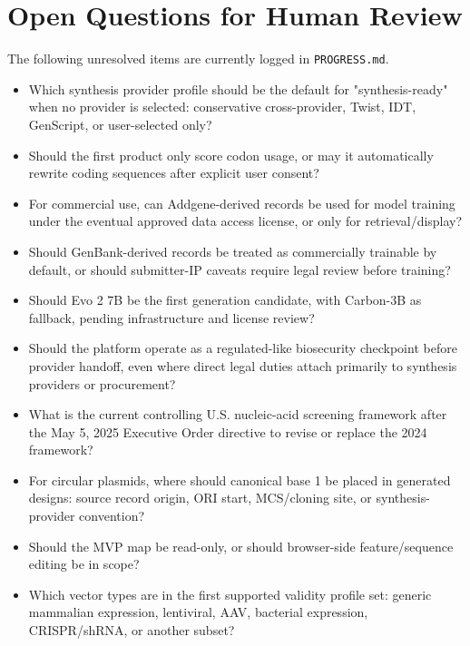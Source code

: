 \documentclass[11pt]{report}
\begin{document}
\chapter{Open Questions for Human Review}
The following unresolved items are currently logged in \texttt{PROGRESS.md}.
\begin{itemize}
\item Which synthesis provider profile should be the default for "synthesis-ready" when no provider is selected: conservative cross-provider, Twist, IDT, GenScript, or user-selected only?
\item Should the first product only score codon usage, or may it automatically rewrite coding sequences after explicit user consent?
\item For commercial use, can Addgene-derived records be used for model training under the eventual approved data access license, or only for retrieval/display?
\item Should GenBank-derived records be treated as commercially trainable by default, or should submitter-IP caveats require legal review before training?
\item Should Evo 2 7B be the first generation candidate, with Carbon-3B as fallback, pending infrastructure and license review?
\item Should the platform operate as a regulated-like biosecurity checkpoint before provider handoff, even where direct legal duties attach primarily to synthesis providers or procurement?
\item What is the current controlling U.S. nucleic-acid screening framework after the May 5, 2025 Executive Order directive to revise or replace the 2024 framework?
\item For circular plasmids, where should canonical base 1 be placed in generated designs: source record origin, ORI start, MCS/cloning site, or synthesis-provider convention?
\item Should the MVP map be read-only, or should browser-side feature/sequence editing be in scope?
\item Which vector types are in the first supported validity profile set: generic mammalian expression, lentiviral, AAV, bacterial expression, CRISPR/shRNA, or another subset?
\end{itemize}
\end{document}

